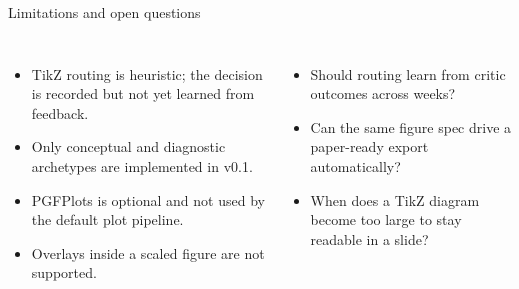 \begin{frame}{Limitations and open questions}
\begin{columns}[T]
\begin{itemize}
  \item TikZ routing is heuristic; the decision is recorded but not yet learned from feedback.
  \item Only conceptual and diagnostic archetypes are implemented in v0.1.
  \item PGFPlots is optional and not used by the default plot pipeline.
  \item Overlays inside a scaled figure are not supported.
\end{itemize}
\begin{itemize}
  \item Should routing learn from critic outcomes across weeks?
  \item Can the same figure spec drive a paper-ready export automatically?
  \item When does a TikZ diagram become too large to stay readable in a slide?
\end{itemize}
\end{columns}
\end{frame}
